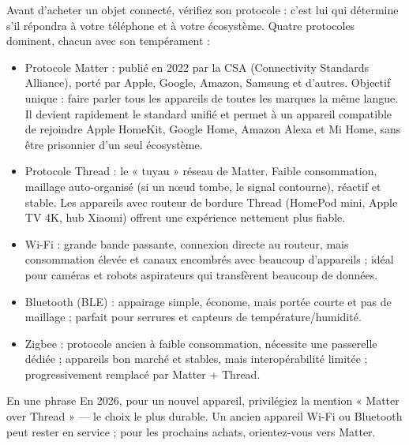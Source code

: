


Avant d'acheter un objet connecté, vérifiez son protocole : c'est lui qui détermine s'il répondra à votre téléphone et à votre écosystème. Quatre protocoles dominent, chacun avec son tempérament :

\begin{itemize}
  \item Protocole Matter : publié en 2022 par la CSA (Connectivity Standards Alliance), porté par Apple, Google, Amazon, Samsung et d'autres. Objectif unique : faire parler tous les appareils de toutes les marques la même langue. Il devient rapidement le standard unifié et permet à un appareil compatible de rejoindre Apple HomeKit, Google Home, Amazon Alexa et Mi Home, sans être prisonnier d'un seul écosystème.
  \item Protocole Thread : le « tuyau » réseau de Matter. Faible consommation, maillage auto-organisé (si un nœud tombe, le signal contourne), réactif et stable. Les appareils avec routeur de bordure Thread (HomePod mini, Apple TV 4K, hub Xiaomi) offrent une expérience nettement plus fiable.
  \item Wi-Fi : grande bande passante, connexion directe au routeur, mais consommation élevée et canaux encombrés avec beaucoup d'appareils ; idéal pour caméras et robots aspirateurs qui transfèrent beaucoup de données.
  \item Bluetooth (BLE) : appairage simple, économe, mais portée courte et pas de maillage ; parfait pour serrures et capteurs de température/humidité.
  \item Zigbee : protocole ancien à faible consommation, nécessite une passerelle dédiée ; appareils bon marché et stables, mais interopérabilité limitée ; progressivement remplacé par Matter + Thread.
\end{itemize}

\begin{tcbinfo}{En une phrase}
En 2026, pour un nouvel appareil, privilégiez la mention « Matter over Thread » — le choix le plus durable. Un ancien appareil Wi-Fi ou Bluetooth peut rester en service ; pour les prochains achats, orientez-vous vers Matter.

\end{tcbinfo}


